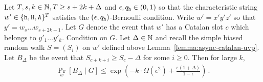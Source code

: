 \begin{bound}\label{bound:unique-honest-catalan-Delta}
  Let $T, s, k \in \mathbb{N}, T \geq s + 2k + \Delta$ and 
  $\epsilon, q_{\mathtt{h}} \in (0, 1)$ so that 
  the characteristic string $w' \in \{\mathtt{h}, \mathtt{H}, \mathtt{A}\}^T$ 
  satisfies the $(\epsilon, q_{\mathtt{h}})$-Bernoulli condition. 
  Write $w' = x'y'z'$ so that $y' = w_s \ldots w_{s + 2k - 1}$. 
  Let $G$ denote the event that 
  $w'$ has a Catalan slot $c$ 
  which belongs to $y'_1 \ldots y'_k$. 
  Condition on $G$. 
  Let $\Delta \in \mathbb{N}$ and 
  recall the simple biased random walk $S = (S_i)$ on $w'$ 
  defined above Lemma~\ref{lemma:async-catalan-uvp}. 
  Let $B_\Delta$ be the event that 
  $S_{c + k + i} \geq S_{c} - \Delta$ for some $i \geq 0$. 
  Then for large $k$, 
  \begin{align}\label{eq:prob-Delta-after-catalan}
    \Pr_w[B_\Delta \mid G] \leq 
      \exp\left( 
        -k\cdot \Omega(\epsilon^2)
        + 
        \frac{\epsilon(1+\Delta)}{1 - \epsilon} 
    \right)
    \,.
  \end{align}
\end{bound}
